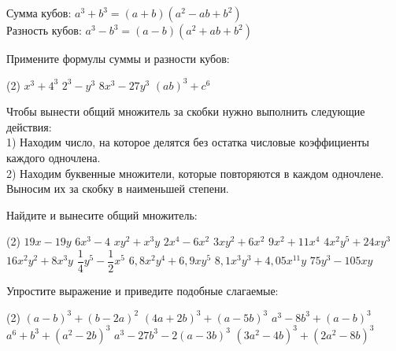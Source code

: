 \begin{class}[number=1]
\begin{listofex}[resume]
	\end{listofex}
	\begin{definit}
		Сумма кубов: \( a^3+b^3=(a+b)(a^2-ab+b^2) \) \\
		Разность кубов: \( a^3-b^3=(a-b)(a^2+ab+b^2) \)
	\end{definit}
	\begin{listofex}[resume]
		\item Примените формулы суммы и разности кубов:
		\begin{tasks}(2)
			\task \( x^3+4^3 \)
			\task \( 2^3-y^3 \)
			\task \( 8x^3-27y^3 \)
			\task \( (ab)^3+c^6 \)
		\end{tasks}
	\end{listofex}
		\begin{definit}
		Чтобы вынести общий множитель за скобки нужно выполнить следующие действия:
		\\ 1) Находим число, на которое делятся без остатка числовые коэффициенты каждого одночлена.
		\\ 2) Находим буквенные множители, которые повторяются в каждом одночлене. Выносим их за скобку в наименьшей степени.
		\end{definit}
	\begin{listofex}[resume]
		\item Найдите и вынесите общий множитель:
		\begin{tasks}(2)
			\task \( 19x-19y \)
			\task \( 6x^3-4 \)
			\task \( xy^2+x^3y \)
			\task \( 2x^4-6x^2 \)
			\task \( 3xy^2+6x^2 \)
			\task \( 9x^2+11x^4 \)
			\task \( 4x^2y^5+24xy^3 \)
			\task \( 16x^2y^2+8x^3y \)
			\task \( \dfrac{1}{4}y^5-\dfrac{1}{2}x^5 \)
			\task \( 6,8x^2y^4 + 6,9xy^5 \)
			\task \( 8,1x^3y^3 + 4,05x^{11}y \)
			\task \( 75y^3 - 105xy \)
		\end{tasks}
		\item Упростите выражение и приведите подобные слагаемые:
		\begin{tasks}(2)
			\task \( (a-b)^3+(b-2a)^2 \)
			\task \( (4a+2b)^3+(a-5b)^3 \)
			\task \( a^3-8b^3+(a-b)^3 \)
			\task \( a^6+b^3+(a^2-2b)^3 \)
			\task \( a^3-27b^3 - 2(a-3b)^3 \)
			\task \( (3a^2-4b)^3+(2a^2-8b)^3 \)
		\end{tasks}
	\end{listofex}
\end{class}


